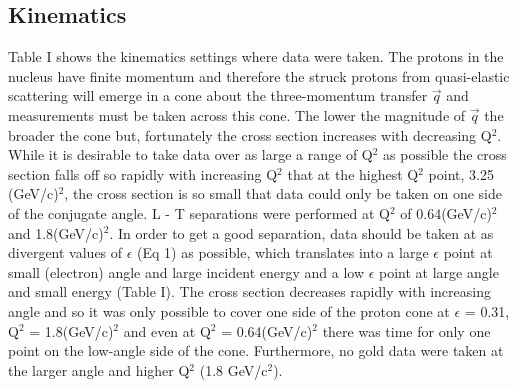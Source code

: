 \documentclass[aps,prl,twocolumn,showpacs,amsmath,amssymb,floats]{revtex4}
\begin{document}
\subsection*{Kinematics}
Table I shows the kinematics settings where data were taken.  The protons in the 
nucleus have finite momentum and therefore the struck protons from quasi-elastic 
scattering will emerge in a cone about the three-momentum transfer $\vec{q}$  
and measurements must be taken across this cone.  The lower the magnitude of 
$\vec{q}$ the broader the cone but, fortunately the cross section increases 
with decreasing Q$^2$.  While it is desirable to take data over as large a range 
of Q$^2$ as possible the cross section falls off so rapidly with increasing 
Q$^2$ that at the highest Q$^2$ point, 3.25 (GeV/c)$^2$, the cross section is so 
small that data could only be taken on one side of the conjugate angle.  L - T 
separations were performed at Q$^2$ of 0.64(GeV/c)$^2$ and 1.8(GeV/c)$^2$.   In 
order to get a good separation, data should be taken at as divergent values of 
$\epsilon$ (Eq 1) as possible, which translates into a large $\epsilon$ point at 
small (electron) angle and large incident energy and a low $\epsilon$ point at 
large angle and small energy (Table I).  The cross section decreases rapidly 
with increasing angle and so it was only possible to cover one side of the 
proton cone at $\epsilon$ = 0.31, Q$^2$ = 1.8(GeV/c)$^2$ and even at Q$^2$ = 
0.64(GeV/c)$^2$ there was time for only one point on the low-angle side of the 
cone.  Furthermore, no gold data were taken at the larger angle and higher 
Q$^2$ (1.8 GeV/c$^2$).
\end{document}
